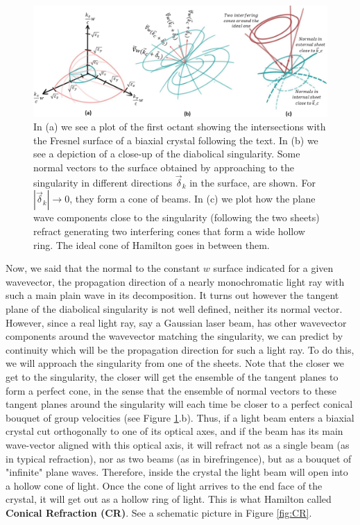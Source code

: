 \documentclass[11pt, a4paper, twoside]{article} %
\begin{document}
\begin{figure}[h!] 
\center
    \includegraphics[width=0.95\linewidth]{bi.PNG}
    \caption{In (a) we see a plot of the first octant showing the intersections with the Fresnel surface of a biaxial crystal following the text. In (b) we see a depiction of a close-up of the diabolical singularity. Some normal vectors to the surface obtained by approaching to the singularity in different directions $\vec{\delta}_k$ in the surface, are shown. For $|\vec{\delta}_k|\rightarrow 0$, they form a cone of beams. In (c) we plot how the plane wave components close to the singularity (following the two sheets) refract generating two interfering cones that form a wide hollow ring. The ideal cone of Hamilton goes in between them.}
    \label{fig:concentric2}\vspace{-0.1cm}
\end{figure}

Now, we said that the normal to the constant $w$ surface indicated for a given wavevector, the propagation direction of a nearly monochromatic light ray with such a main plain wave in its decomposition. It turns out however the tangent plane of the diabolical singularity is not well defined, neither its normal vector. However, since a real light ray, say a Gaussian laser beam, has other wavevector components around the wavevector matching the singularity, we can predict by continuity which will be the propagation direction for such a light ray. To do this, we will approach the singularity from one of the sheets. Note that the closer we get to the singularity, the closer will get the ensemble of the tangent planes to form a perfect cone, in the sense that the ensemble of normal vectors to these tangent planes around the singularity will each time be closer to a perfect conical bouquet of group velocities (see Figure \ref{fig:concentric2}.b). Thus, if a light beam enters a biaxial crystal cut orthogonally to one of its optical axes, and if the beam has its main wave-vector aligned with this optical axis, it will refract not as a single beam (as in typical refraction), nor as two beams (as in birefringence), but as a bouquet of "infinite" plane waves. Therefore, inside the crystal the light beam will open into a hollow cone of light. Once the cone of light arrives to the end face of the crystal, it will get out as a hollow ring of light. This is what Hamilton called {\bf Conical Refraction (CR)}. See a schematic picture in Figure \ref{fig:CR}.\vspace{0.2cm}
\end{document}
